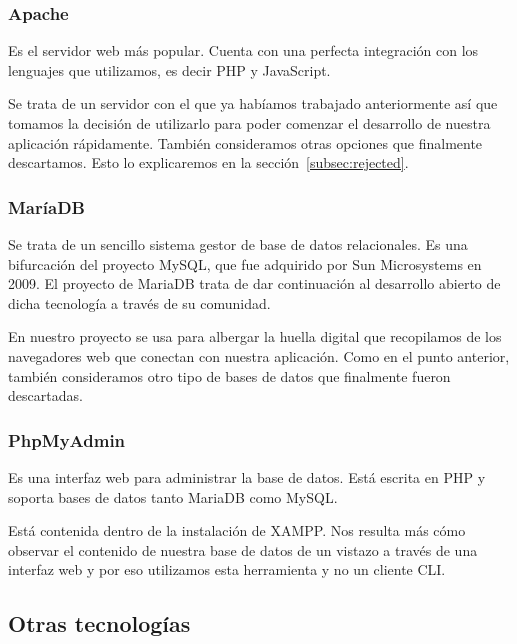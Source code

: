 \subsubsection{Apache}

Es el servidor web más popular. Cuenta con una perfecta integración con los lenguajes que utilizamos, es decir PHP y JavaScript. \par 

Se trata de un servidor con el que ya habíamos trabajado anteriormente así que tomamos la decisión de utilizarlo para poder comenzar el desarrollo de nuestra aplicación rápidamente. También consideramos otras opciones que finalmente descartamos. Esto lo explicaremos en la sección~\ref{subsec:rejected}. \par 

\subsubsection{MaríaDB}

Se trata de un sencillo sistema gestor de base de datos relacionales. Es una bifurcación del proyecto MySQL, que fue adquirido por Sun Microsystems en 2009. El proyecto de MariaDB trata de dar continuación al desarrollo abierto de dicha tecnología a través de su comunidad. \par 

En nuestro proyecto se usa para albergar la huella digital que recopilamos de los navegadores web que conectan con nuestra aplicación. Como en el punto anterior, también consideramos otro tipo de bases de datos que finalmente fueron descartadas. \par 

\subsubsection{PhpMyAdmin}

Es una interfaz web para administrar la base de datos. Está escrita en PHP y soporta bases de datos tanto MariaDB como MySQL. \par 

Está contenida dentro de la instalación de XAMPP. Nos resulta más cómo observar el contenido de nuestra base de datos de un vistazo a través de una interfaz web y por eso utilizamos esta herramienta y no un cliente CLI. \par 

\subsection{Otras tecnologías}


